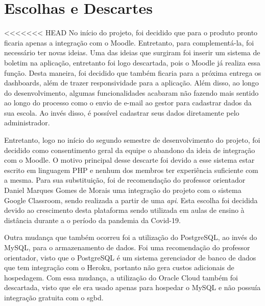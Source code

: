 \section{Escolhas e Descartes}
<<<<<<< HEAD
No início do projeto, foi decidido que para o produto pronto ficaria apenas a integração com o Moodle. Entretanto, para complementá-la, foi necessário ter novas ideias. Uma das ideias que surgiram foi inserir um sistema de boletim na aplicação, entretanto foi logo descartada, pois o Moodle já realiza essa função. Desta maneira, foi decidido que também ficaria para a próxima entrega os \glspl{dashboard}, além de trazer responsividade para a aplicação. Além disso, ao longo do desenvolvimento, algumas funcionalidades acabaram não fazendo mais sentido ao longo do processo como o envio de e-mail ao gestor para cadastrar dados da sua escola. Ao invés disso, é possível cadastrar seus dados diretamente pelo administrador.

Entretanto, logo no início do segundo semestre de desenvolvimento do projeto, foi decidido como consentimento geral da equipe o abandono da ideia de integração com o Moodle. O motivo principal desse descarte foi devido a esse sistema estar escrito em linguagem PHP e nenhum dos membros ter experiência suficiente com a mesma. Para sua substituição, foi de recomendação do professor orientador Daniel Marques Gomes de Morais uma integração do projeto com o sistema Google Classroom, sendo realizada a partir de uma \textit{\ac{api}}. Esta escolha foi decidida devido ao crescimento desta plataforma sendo utilizada em aulas de ensino à distância durante a o período da pandemia da Covid-19.

Outra mudança que também ocorreu foi a utilização do PostgreSQL, ao invés do MySQL, para o armazenamento de dados. Foi uma recomendação do professor orientador, visto que o PostgreSQL é um sistema gerenciador de banco de dados que tem integração com o Heroku, portanto não gera custos adicionais de hospedagem. Com essa mudança, a utilização do Oracle Cloud também foi descartada, visto que ele era usado apenas para hospedar o MySQL e não possuía integração gratuita com o \ac{sgbd}.

